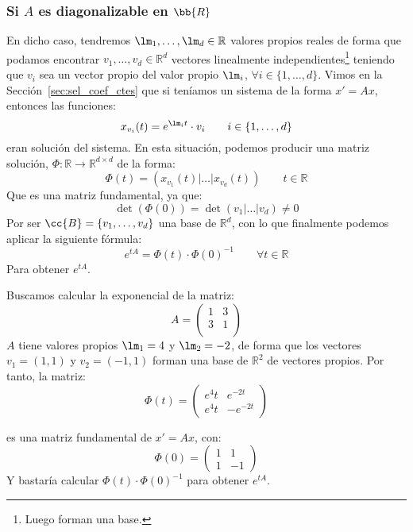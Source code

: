 \subsubsection{Si $A$ es diagonalizable en $\bb{R}$}
\noindent
En dicho caso, tendremos $\lm_1,\ldots,\lm_d\in \mathbb{R}$ valores propios reales de forma que podamos encontrar $v_1,\ldots,v_d\in \mathbb{R}^d$ vectores linealmente independientes\footnote{Luego forman una base.} teniendo que $v_i$ sea un vector propio del valor propio $\lm_i$, $\forall i \in \{1,\ldots,d\}$. Vimos en la Sección~\ref{sec:sel_coef_ctes} que si teníamos un sistema de la forma $x'=Ax$, entonces las funciones:
\begin{equation*}
    x_{v_i}(t) = e^{\lm_i t} \cdot v_i \qquad i \in \{1,\ldots,d\}
\end{equation*}
eran solución del sistema. En esta situación, podemos producir una matriz solución, $\Phi:\mathbb{R}\rightarrow\mathbb{R}^{d\times d}$ de la forma:
\begin{equation*}
    \Phi(t) = (x_{v_1}(t)|\ldots|x_{v_d}(t)) \qquad t\in \mathbb{R}
\end{equation*}
Que es una matriz fundamental, ya que:
\begin{equation*}
    \det(\Phi(0)) = \det(v_1 | \ldots | v_d) \neq 0
\end{equation*}
Por ser $\cc{B}=\{v_1,\ldots,v_d\}$ una base de $\mathbb{R}^d$, con lo que finalmente podemos aplicar la siguiente fórmula:
\begin{equation*}
    e^{tA} = \Phi(t)\cdot \Phi(0)^{-1} \qquad \forall t\in \mathbb{R}
\end{equation*}
Para obtener $e^{tA}$.
\begin{ejemplo}
    Buscamos calcular la exponencial de la matriz:
    \begin{equation*}
        A = \left(\begin{array}{cc}
                1 & 3 \\
                3 & 1 \\
        \end{array}\right)
    \end{equation*}
    $A$ tiene valores propios $\lm_1=4$ y $\lm_2=-2$, de forma que los vectores $v_1 = (1,1)$ y $v_2=(-1,1)$ forman una base de $\mathbb{R}^2$ de vectores propios. Por tanto, la matriz:
    \begin{equation*}
        \Phi(t) = \left(\begin{array}{cc}
                e^4t & e^{-2t} \\
                e^4t & -e^{-2t} 
        \end{array}\right)
    \end{equation*}

    es una matriz fundamental de $x' = Ax$, con:
    \begin{equation*}
        \Phi(0) = \left(\begin{array}{cc}
                1 & 1 \\
                1 & -1
        \end{array}\right)
    \end{equation*}
    Y bastaría calcular $\Phi(t)\cdot \Phi(0)^{-1}$ para obtener $e^{tA}$.
\end{ejemplo}

